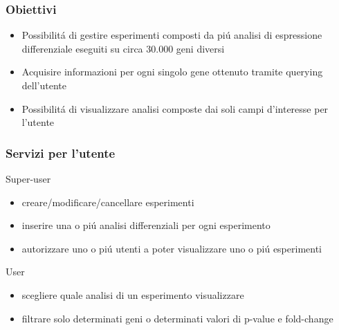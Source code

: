 \documentclass[hyperref={pdfpagelabels=false}]{beamer}
\begin{document}
\begin{frame}\frametitle{Obiettivi}
\begin{itemize}
\item Possibilit\'a di gestire esperimenti composti da pi\'u analisi di espressione differenziale eseguiti su circa 30.000 geni diversi
\item Acquisire informazioni per ogni singolo gene ottenuto tramite querying dell'utente
\item Possibilit\'a di visualizzare analisi composte dai soli campi d'interesse per l'utente
\end{itemize}
\end{frame}

\begin{frame}\frametitle{Servizi per l'utente}
\begin{block}{Super-user}
\begin{itemize}
\item creare/modificare/cancellare esperimenti
\item inserire una o pi\'u analisi differenziali per ogni esperimento
\item autorizzare uno o pi\'u utenti a poter visualizzare uno o pi\'u esperimenti
\end{itemize}
\end{block}
\begin{exampleblock}{User}
\begin{itemize}
\item scegliere quale analisi di un esperimento visualizzare
\item filtrare solo determinati geni o determinati valori di p-value e fold-change
\end{itemize}
\end{exampleblock}
\bigskip
\bigskip
\bigskip
\end{frame}
\end{document}
